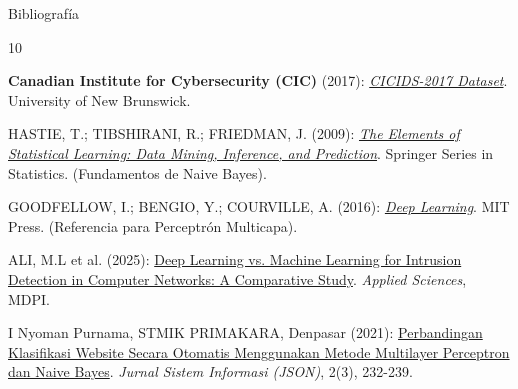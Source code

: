 \documentclass{beamer}
\begin{document}
\begin{frame}[allowframebreaks]{Bibliografía}
    \begin{thebibliography}{10}
        
        \textbf{Canadian Institute for Cybersecurity (CIC)} (2017): \href{https://www.unb.ca/cic/datasets/ids-2017.html}{\textit{CICIDS-2017 Dataset}}. University of New Brunswick.
        
        HASTIE, T.; TIBSHIRANI, R.; FRIEDMAN, J. (2009): \href{https://hastie.su.domains/ElemStatLearn/}{\textit{The Elements of Statistical Learning: Data Mining, Inference, and Prediction}}. Springer Series in Statistics. (Fundamentos de Naive Bayes).
        
        GOODFELLOW, I.; BENGIO, Y.; COURVILLE, A. (2016): \href{https://www.deeplearningbook.org/}{\textit{Deep Learning}}. MIT Press. (Referencia para Perceptrón Multicapa).
        
        ALI, M.L et al. (2025): \href{https://www.mdpi.com/2076-3417/15/4/1903}{Deep Learning vs. Machine Learning for Intrusion Detection in Computer Networks: A Comparative Study}. \textit{Applied Sciences}, MDPI.
        
        I Nyoman Purnama, STMIK PRIMAKARA, Denpasar (2021): \href{https://ejurnal.stmik-budidarma.ac.id/index.php/JSON/article/view/2703/1899}{Perbandingan Klasifikasi Website Secara Otomatis Menggunakan Metode Multilayer Perceptron dan Naive Bayes}. \textit{Jurnal Sistem Informasi (JSON)}, 2(3), 232-239.

    \end{thebibliography}
\end{frame}
\end{document}
